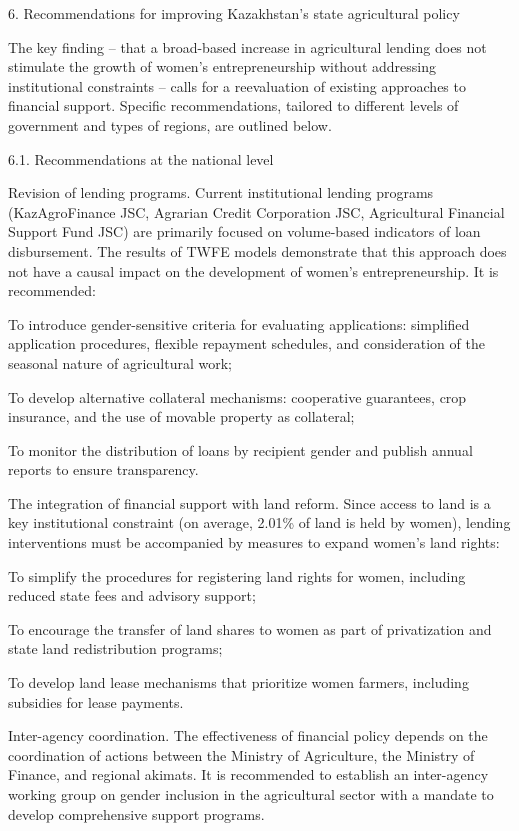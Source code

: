 \documentclass[
]{article}
\begin{document}
6. Recommendations for improving Kazakhstan's state agricultural policy

The key finding -- that a broad-based increase in agricultural lending
does not stimulate the growth of women's entrepreneurship without
addressing institutional constraints -- calls for a reevaluation of
existing approaches to financial support. Specific recommendations,
tailored to different levels of government and types of regions, are
outlined below.

6.1. Recommendations at the national level

Revision of lending programs. Current institutional lending programs
(KazAgroFinance JSC, Agrarian Credit Corporation JSC, Agricultural
Financial Support Fund JSC) are primarily focused on volume-based
indicators of loan disbursement. The results of TWFE models demonstrate
that this approach does not have a causal impact on the development of
women's entrepreneurship. It is recommended:

To introduce gender-sensitive criteria for evaluating applications:
simplified application procedures, flexible repayment schedules, and
consideration of the seasonal nature of agricultural work;

To develop alternative collateral mechanisms: cooperative guarantees,
crop insurance, and the use of movable property as collateral;

To monitor the distribution of loans by recipient gender and publish
annual reports to ensure transparency.

The integration of financial support with land reform. Since access to
land is a key institutional constraint (on average, 2.01\% of land is
held by women), lending interventions must be accompanied by measures to
expand women's land rights:

To simplify the procedures for registering land rights for women,
including reduced state fees and advisory support;

To encourage the transfer of land shares to women as part of
privatization and state land redistribution programs;

To develop land lease mechanisms that prioritize women farmers,
including subsidies for lease payments.

Inter-agency coordination. The effectiveness of financial policy depends
on the coordination of actions between the Ministry of Agriculture, the
Ministry of Finance, and regional akimats. It is recommended to
establish an inter-agency working group on gender inclusion in the
agricultural sector with a mandate to develop comprehensive support
programs.
\end{document}
